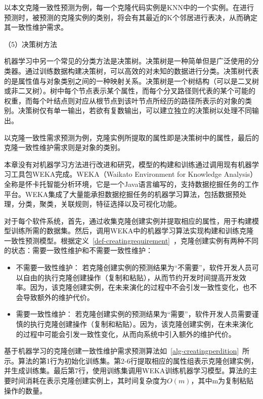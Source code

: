以本文克隆一致性预测为例，每一个克隆代码实例是KNN中的一个实例。在进行预测时，被预测的克隆实例的类别，将会有其最近的K个邻居进行表决，从而确定其一致性维护需求。

（5）决策树方法

机器学习中另一个常见的分类方法是决策树。决策树是一种简单但是广泛使用的分类器。通过训练数据构建决策树，可以高效的对未知的数据进行分类。决策树代表的是属性值与对象类别之间的一种映射关系。决策树是一个树结构（可以是二叉树或非二叉树）。树中每个节点表示某个属性，而每个分叉路径则代表的某个可能的权重，而每个叶结点则对应从根节点到该叶节点所经历的路径所表示的对象的类别。决策树仅有单一输出，若欲有复数输出，可以建立独立的决策树以处理不同输出。

以克隆一致性需求预测为例，克隆实例所提取的属性即是决策树中的属性，最后的克隆一致性维护需求则是对象的类别。

本章没有对机器学习方法进行改进和研究，模型的构建和训练通过调用现有机器学习工具包WEKA完成。WEKA（Waikato Environment for Knowledge Analysis）全称是怀卡托智能分析环境，它是一个Java语言编写的，支持数据挖掘任务的工作平台。WEKA集成了大量能承担数据挖掘任务的机器学习算法，包括数据预处理，分类，聚类，关联规则，特征选择以及可视化功能。

对于每个软件系统，首先，通过收集克隆创建实例并提取相应的属性，用于构建模型训练所需的数据集。然后，调用WEKA中的机器学习算法实现构建和训练克隆一致性预测模型。根据定义~\ref{def-creatingrequirement}~，克隆创建实例有两种不同的状态：需要一致性维护和不需要一致性维护：
\begin{itemize}
\item 
不需要一致性维护：
若克隆创建实例的预测结果为“不需要”，软件开发人员可以自由的执行克隆创建操作（复制和粘贴），从而节约开发时间提高开发效率。因为，该克隆创建实例，在未来演化的过程中不会引发一致性变化，也不会导致额外的维护代价。
\item
需要一致性维护：
若克隆创建实例的预测结果为“需要”，软件开发人员需要谨慎的执行克隆创建操作（复制和粘贴）。因为，该克隆创建实例，在未来演化的过程中可能会引发一致性变化，从而向系统中引入额外的维护代价。
\end{itemize}

基于机器学习的克隆创建一致性维护需求预测算法如~\ref{alg-creatingperdition}~所示。算法的第1行为初始化训练集。第2-6行提取相应的属性组表示克隆创建实例，并生成训练集。最后第7行，使用训练集调用WEKA训练机器学习模型。算法的主要时间消耗在表示克隆创建实例上，其时间复杂度为$O(m)$，其中m为复制粘贴操作的数量。

